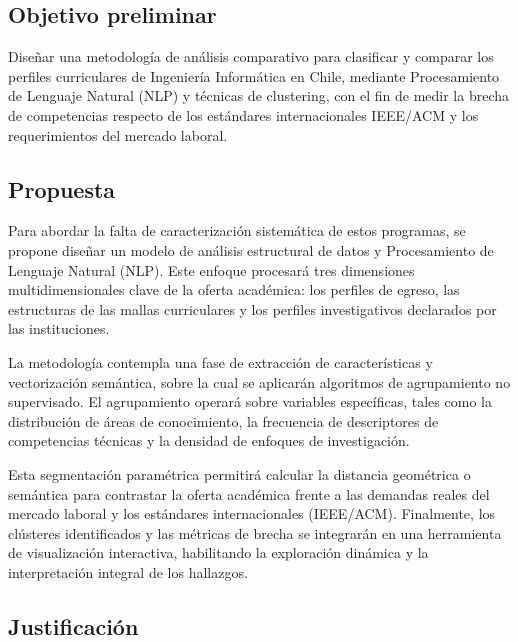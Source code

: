 \documentclass[journal,twoside,web]{ieeecolor}
\begin{document}
\subsection{Objetivo preliminar} \label{objetivo}
Diseñar una metodología de análisis comparativo para clasificar y comparar los perfiles curriculares de Ingeniería Informática en Chile, mediante Procesamiento de Lenguaje Natural (NLP) y técnicas de clustering, con el fin de medir la brecha de competencias respecto de los estándares internacionales IEEE/ACM y los requerimientos del mercado laboral.
\subsection{Propuesta} \label{Propuesta}

Para abordar la falta de caracterización sistemática de estos programas, se propone diseñar un modelo de análisis estructural de datos y Procesamiento de Lenguaje Natural (NLP). Este enfoque procesará tres dimensiones multidimensionales clave de la oferta académica: los perfiles de egreso, las estructuras de las mallas curriculares y los perfiles investigativos declarados por las instituciones.

La metodología contempla una fase de extracción de características y vectorización semántica, sobre la cual se aplicarán algoritmos de agrupamiento no supervisado. El agrupamiento operará sobre variables específicas, tales como la distribución de áreas de conocimiento, la frecuencia de descriptores de competencias técnicas y la densidad de enfoques de investigación.

Esta segmentación paramétrica permitirá calcular la distancia geométrica o semántica para contrastar la oferta académica frente a las demandas reales del mercado laboral y los estándares internacionales (IEEE/ACM). Finalmente, los clústeres identificados y las métricas de brecha se integrarán en una herramienta de visualización interactiva, habilitando la exploración dinámica y la interpretación integral de los hallazgos.
        
\subsection{Justificación} \label{Justificación}
\end{document}
